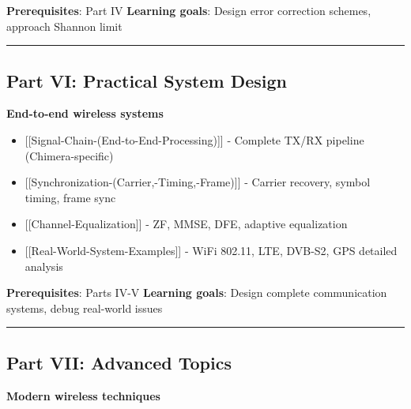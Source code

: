 \textbf{Prerequisites}: Part IV \textbf{Learning goals}: Design error
correction schemes, approach Shannon limit

\begin{center}\rule{0.5\linewidth}{0.5pt}\end{center}

\subsection{\texorpdfstring{ Part VI: Practical System
Design}{ Part VI: Practical System Design}}\label{part-vi-practical-system-design}

\textbf{End-to-end wireless systems}

\begin{itemize}
\tightlist
\item
  {[}{[}Signal-Chain-(End-to-End-Processing){]}{]} - Complete TX/RX
  pipeline (Chimera-specific)
\item
  {[}{[}Synchronization-(Carrier,-Timing,-Frame){]}{]} - Carrier
  recovery, symbol timing, frame sync
\item
  {[}{[}Channel-Equalization{]}{]} - ZF, MMSE, DFE, adaptive
  equalization
\item
  {[}{[}Real-World-System-Examples{]}{]} - WiFi 802.11, LTE, DVB-S2, GPS
  detailed analysis
\end{itemize}

\textbf{Prerequisites}: Parts IV-V \textbf{Learning goals}: Design
complete communication systems, debug real-world issues

\begin{center}\rule{0.5\linewidth}{0.5pt}\end{center}

\subsection{\texorpdfstring{ Part VII: Advanced
Topics}{ Part VII: Advanced Topics}}\label{part-vii-advanced-topics}

\textbf{Modern wireless techniques}

